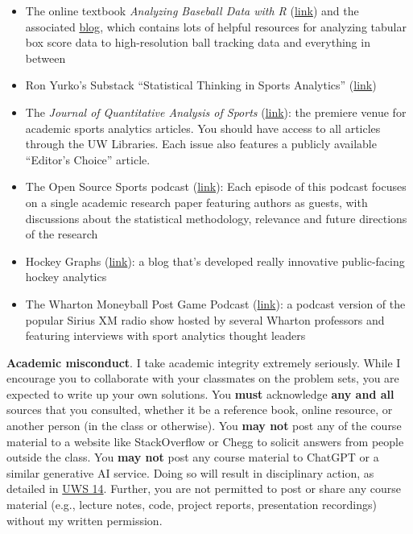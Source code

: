 \documentclass[11pt]{article}
\begin{document}
\begin{itemize}
\item{The online textbook \textit{Analyzing Baseball Data with R} (\href{https://beanumber.github.io/abdwr3e/}{link}) and the associated \href{https://baseballwithr.wordpress.com}{blog}, which contains lots of helpful resources for analyzing tabular box score data to high-resolution ball tracking data and everything in between}
\item{Ron Yurko's Substack ``Statistical Thinking in Sports Analytics'' (\href{https://statthinksportsanalytics.substack.com}{link})}
\item{The \textit{Journal of Quantitative Analysis of Sports} (\href{https://www.degruyter.com/journal/key/jqas/html?lang=en&srsltid=AfmBOoqvNglsW_tIa2IHQ4uaPHDGblGz1zYkSjhFjVazKZUzFFg3mnhp}{link}): the premiere venue for academic sports analytics articles. You should have access to all articles through the UW Libraries. Each issue also features a publicly available ``Editor's Choice'' article.}
\item{The Open Source Sports podcast (\href{https://open.spotify.com/show/3vTtH2JJXbjrzOtEfjrqc4}{link}): Each episode of this podcast focuses on a single academic research paper featuring authors as guests, with discussions about the statistical methodology, relevance and future directions of the research}
\item{Hockey Graphs (\href{https://hockey-graphs.com}{link}): a blog that's developed really innovative public-facing hockey analytics}
\item{The Wharton Moneyball Post Game Podcast (\href{https://knowledge.wharton.upenn.edu/shows/moneyball-highlights/}{link}): a podcast version of the popular Sirius XM radio show hosted by several Wharton professors and featuring interviews with sport analytics thought leaders}
\end{itemize}


\textbf{Academic misconduct}. I take academic integrity extremely seriously. While I encourage you to collaborate with your classmates on the problem sets, you are expected to write up your own solutions. 
You \textbf{must} acknowledge \textbf{any and all} sources that you consulted, whether it be a reference book, online resource, or another person (in the class or otherwise). 
You \textbf{may not} post any of the course material to a website like StackOverflow or Chegg to solicit answers from people outside the class. 
You \textbf{may not} post any course material to ChatGPT or a similar generative AI service. 
Doing so will result in disciplinary action, as detailed in \href{https://docs.legis.wisconsin.gov/code/admin_code/uws/14}{UWS 14}. 
Further, you are not permitted to post or share any course material (e.g., lecture notes, code, project reports, presentation recordings) without my written permission.
\end{document}
